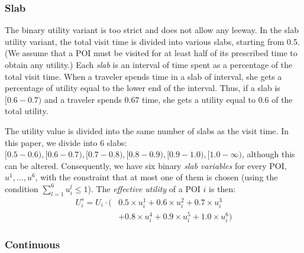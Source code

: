 \subsubsection{\textbf{Slab}}
\label{sec:slab}

The binary utility variant is too strict and does not allow any leeway.
In the slab utility variant, the total visit time is divided into various slabs, starting from
0.5.  (We assume that a POI must be visited for at least half of its prescribed time
to obtain any utility.) Each \emph{slab} is an interval of time spent as a percentage
of the total visit time.  When a traveler spends time in a slab of
interval, she gets a percentage of utility equal to the lower end of the
interval.  Thus, if a slab is $[0.6-0.7)$ and a traveler spends $0.67$ time,
she gets a utility equal to $0.6$ of the total utility.

The utility value is divided into the same number of slabs as the visit
time.  In this paper, we divide into 6 slabs: $[0.5-0.6), [0.6-0.7), [0.7-0.8),
[0.8-0.9), [0.9-1.0), [1.0-\infty)$, although this can be altered.
Consequently, we have six binary \emph{slab variables} for every POI,
$u^1, \dots, u^6$, with the constraint that at most one of them is chosen
(using the condition $\sum_{l=1}^6 u^l_i \leq 1$).  The \emph{effective
utility} of a POI $i$ is then:
%
\begin{align}
	\label{eq:slab}
	U^s_i = U_i \cdot ( & 0.5 \times u^1_i + 0.6 \times u^2_i + 0.7 \times u^3_i \nonumber \\
		& + 0.8 \times u^4_i + 0.9 \times u^5_i + 1.0 \times u^6_i )
\end{align}



\subsubsection{\textbf{Continuous}}
\label{sec:continuous}

